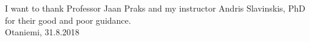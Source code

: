 



\makecoverpage

\makecopyrightpage


  
  

\begin{abstractpage}[english]
	\abstracttext{}
\end{abstractpage}

I want to thank Professor Jaan Praks and my instructor Andris Slavinskis, PhD for 
their good and poor guidance.\\

\vspace{5cm}
Otaniemi, 31.8.2018

